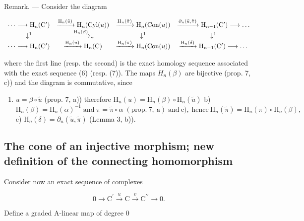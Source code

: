 Remark. --- Consider the diagram

\[
\begin{array}{c c c c c} \dots \longrightarrow \mathrm{H} _ {n} (\mathrm{C} ^ {\prime}) & \xrightarrow {\mathrm{H} _ {n} (\tilde {u})} \mathrm{H} _ {n} (\text {Cyl} (u)) & \xrightarrow {\mathrm{H} _ {n} (\tilde {\pi})} \mathrm{H} _ {n} (\text {Con} (u)) & \xrightarrow {\partial_ {n} (\tilde {u} , \tilde {\pi})} \mathrm{H} _ {n - 1} (\mathrm{C} ^ {\prime}) \longrightarrow \dots \\ \downarrow^ {1} & \xrightarrow {\mathrm{H} _ {n} (\beta)} \downarrow & \downarrow^ {1} & \downarrow^ {1} \\ \dots \longrightarrow \mathrm{H} _ {n} (\mathrm{C} ^ {\prime}) & \xrightarrow {\mathrm{H} _ {n} (u)} \mathrm{H} _ {n} (\mathrm{C}) & \xrightarrow {\mathrm{H} _ {n} (\pi)} \mathrm{H} _ {n} (\text {Con} (u)) & \xrightarrow {\mathrm{H} _ {n} (\delta)} \mathrm{H} _ {n - 1} (\mathrm{C} ^ {\prime}) \longrightarrow \dots \end{array}
\]

where the first line (resp. the second) is the exact homology sequence associated with the exact sequence (6) (resp. (7)). The maps \(H_{n}(\beta)\) are bijective (prop. 7, c)) and the diagram is commutative, since

\begin{enumerate}
\def\labelenumi{\alph{enumi})}
\tightlist
\item
  \(u = \beta \circ \tilde{u}\) (prop. 7, a)) therefore \(\mathrm{H}_n(u) = \mathrm{H}_n(\beta) \circ \mathrm{H}_n(\tilde{u})\) b) \(\mathrm{H}_{n}(\beta)=\mathrm{H}_{n}(\alpha)^{-1}\;\mathrm{and}\;\pi=\tilde{\pi}\circ\alpha\;(\mathrm{prop.~7,~a})\;\mathrm{and~c}),\;\mathrm{hence~}\mathrm{H}_{n}(\tilde{\pi})=\mathrm{H}_{n}(\pi)\circ\mathrm{H}_{n}(\beta),\) c) \(\mathrm{H}_{n}(\delta)=\partial_{n}(\tilde{u},\tilde{\pi})\) (Lemma 3, b)).
\end{enumerate}

\subsection{The cone of an injective morphism; new definition of the connecting homomorphism}

Consider now an exact sequence of complexes

\[
0 \rightarrow \mathrm{C} ^ {\prime} \xrightarrow {u} \mathrm{C} \xrightarrow {v} \mathrm{C} ^ {\prime \prime} \rightarrow 0.\tag{9}
\]

Define a graded A-linear map of degree 0

